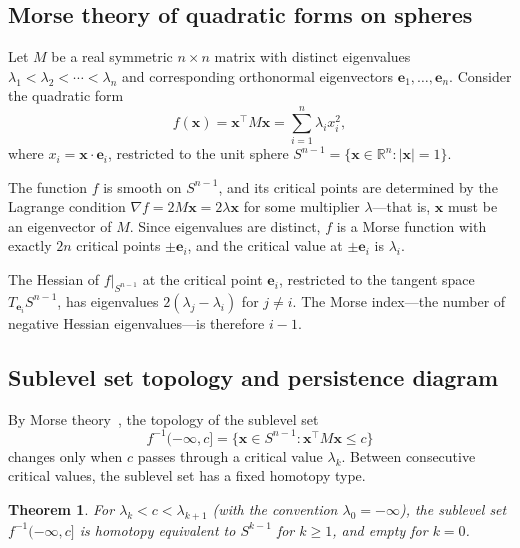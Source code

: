 \documentclass[aps,pre,twocolumn,superscriptaddress,showpacs]{revtex4-2}
\newtheorem{theorem}{Theorem}
\begin{document}
\subsection{Morse theory of quadratic forms on spheres}
\label{sec:morse}

Let $M$ be a real symmetric $n \times n$ matrix with distinct eigenvalues $\lambda_1 < \lambda_2 < \cdots < \lambda_n$ and corresponding orthonormal eigenvectors $\mathbf{e}_1, \ldots, \mathbf{e}_n$. Consider the quadratic form
\begin{equation}
f(\mathbf{x}) = \mathbf{x}^\top M \mathbf{x} = \sum_{i=1}^n \lambda_i x_i^2,
\label{eq:quadratic}
\end{equation}
where $x_i = \mathbf{x} \cdot \mathbf{e}_i$, restricted to the unit sphere $S^{n-1} = \{\mathbf{x} \in \mathbb{R}^n : |\mathbf{x}| = 1\}$.

The function $f$ is smooth on $S^{n-1}$, and its critical points are determined by the Lagrange condition $\nabla f = 2M\mathbf{x} = 2\lambda \mathbf{x}$ for some multiplier $\lambda$---that is, $\mathbf{x}$ must be an eigenvector of $M$. Since eigenvalues are distinct, $f$ is a Morse function with exactly $2n$ critical points $\pm \mathbf{e}_i$, and the critical value at $\pm \mathbf{e}_i$ is $\lambda_i$.

The Hessian of $f|_{S^{n-1}}$ at the critical point $\mathbf{e}_i$, restricted to the tangent space $T_{\mathbf{e}_i} S^{n-1}$, has eigenvalues $2(\lambda_j - \lambda_i)$ for $j \neq i$. The Morse index---the number of negative Hessian eigenvalues---is therefore $i - 1$.

\subsection{Sublevel set topology and persistence diagram}
\label{sec:sublevel}

By Morse theory~\cite{milnor1963}, the topology of the sublevel set
\begin{equation}
f^{-1}(-\infty, c] = \{\mathbf{x} \in S^{n-1} : \mathbf{x}^\top M \mathbf{x} \le c\}
\end{equation}
changes only when $c$ passes through a critical value $\lambda_k$. Between consecutive critical values, the sublevel set has a fixed homotopy type.

\begin{theorem}
\label{thm:sublevel}
For $\lambda_k < c < \lambda_{k+1}$ (with the convention $\lambda_0 = -\infty$), the sublevel set $f^{-1}(-\infty, c]$ is homotopy equivalent to $S^{k-1}$ for $k \ge 1$, and empty for $k = 0$.
\end{theorem}
\end{document}
